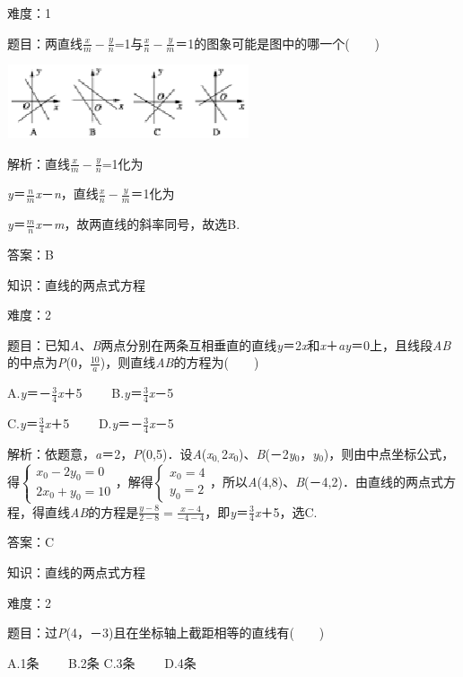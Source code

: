 \documentclass{article} %
\begin{document}
难度：1

题目：两直线$\frac{x}{m}-\frac{y}{n}$=1与$\frac{x}{n}-\frac{y}{m}$＝1的图象可能是图中的哪一个(　　)

\includegraphics*[width=2.81in, height=0.85in, keepaspectratio=false]{image281}

解析：直线$\frac{x}{m}-\frac{y}{n}$=1化为

\textit{y}＝$\frac{n}{m}$\textit{x}－\textit{n}，直线$\frac{x}{n}-\frac{y}{m}$＝1化为

\textit{y}＝$\frac{m}{n}$\textit{x}－\textit{m}，故两直线的斜率同号，故选B.

答案：B

知识：直线的两点式方程

难度：2

题目：已知\textit{A}、\textit{B}两点分别在两条互相垂直的直线\textit{y}＝2\textit{x}和\textit{x}＋\textit{ay}＝0上，且线段\textit{AB}的中点为\textit{P}(0，$\frac{10}{a}$)，则直线\textit{AB}的方程为(　　)

A.\textit{y}＝－$\frac{3}{4}$\textit{x}＋5　　  B.\textit{y}＝$\frac{3}{4}$\textit{x}－5

C.\textit{y}＝$\frac{3}{4}$\textit{x}＋5　　  D.\textit{y}＝－$\frac{3}{4}$\textit{x}－5

解析：依题意，\textit{a}＝2，\textit{P}(0,5)．设\textit{A}(\textit{x}${}_{0,}$2\textit{x}${}_{0}$)、\textit{B}(－2\textit{y}${}_{0}$，\textit{y}${}_{0}$)，则由中点坐标公式，得$\left\{\begin{array}{l} x_0-2y_0=0\\ 2x_0+y_0=10 \end{array}\right.$，解得$\left\{\begin{array}{l} x_0=4\\ y_0=2 \end{array}\right.$，所以\textit{A}(4,8)、\textit{B}(－4,2)．由直线的两点式方程，得直线\textit{AB}的方程是$\frac{y-8}{2-8}=\frac{x-4}{-4-4}$，即\textit{y}＝$\frac{3}{4}$\textit{x}＋5，选C.

答案：C

知识：直线的两点式方程

难度：2

题目：过\textit{P}(4，－3)且在坐标轴上截距相等的直线有(　　)

A.1条　　 B.2条 C.3条　　 D.4条
\end{document}
